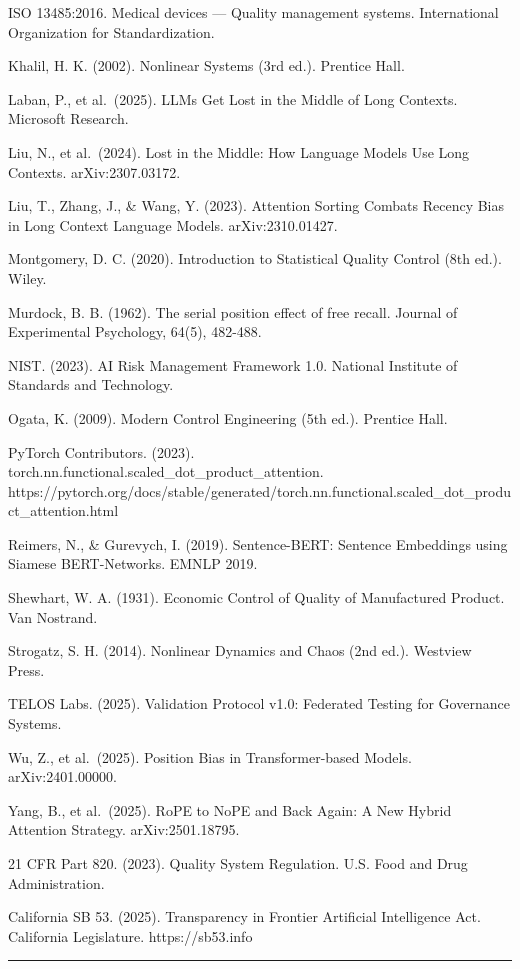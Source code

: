 ISO 13485:2016. Medical devices --- Quality management systems.
International Organization for Standardization.

Khalil, H. K. (2002). Nonlinear Systems (3rd ed.). Prentice Hall.

Laban, P., et al.~(2025). LLMs Get Lost in the Middle of Long Contexts.
Microsoft Research.

Liu, N., et al.~(2024). Lost in the Middle: How Language Models Use Long
Contexts. arXiv:2307.03172.

Liu, T., Zhang, J., \& Wang, Y. (2023). Attention Sorting Combats
Recency Bias in Long Context Language Models. arXiv:2310.01427.

Montgomery, D. C. (2020). Introduction to Statistical Quality Control
(8th ed.). Wiley.

Murdock, B. B. (1962). The serial position effect of free recall.
Journal of Experimental Psychology, 64(5), 482-488.

NIST. (2023). AI Risk Management Framework 1.0. National Institute of
Standards and Technology.

Ogata, K. (2009). Modern Control Engineering (5th ed.). Prentice Hall.

PyTorch Contributors. (2023).
torch.nn.functional.scaled\_dot\_product\_attention.
https://pytorch.org/docs/stable/generated/torch.nn.functional.scaled\_dot\_product\_attention.html

Reimers, N., \& Gurevych, I. (2019). Sentence-BERT: Sentence Embeddings
using Siamese BERT-Networks. EMNLP 2019.

Shewhart, W. A. (1931). Economic Control of Quality of Manufactured
Product. Van Nostrand.

Strogatz, S. H. (2014). Nonlinear Dynamics and Chaos (2nd ed.). Westview
Press.

TELOS Labs. (2025). Validation Protocol v1.0: Federated Testing for
Governance Systems.

Wu, Z., et al.~(2025). Position Bias in Transformer-based Models.
arXiv:2401.00000.

Yang, B., et al.~(2025). RoPE to NoPE and Back Again: A New Hybrid
Attention Strategy. arXiv:2501.18795.

21 CFR Part 820. (2023). Quality System Regulation. U.S. Food and Drug
Administration.

California SB 53. (2025). Transparency in Frontier Artificial
Intelligence Act. California Legislature. https://sb53.info

\begin{center}\rule{0.5\linewidth}{0.5pt}\end{center}

